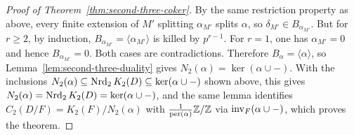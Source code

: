 \begin{proof}[Proof of Theorem~\ref{thm:second-three-coker}]
By the same restriction property as above, every finite extension of $M'$ splitting $\alpha_{M'}$ splits $\alpha$, so $\delta_{M'}\in B_{\alpha_{M'}}$.
But for $r\ge2$, by induction, $B_{\alpha_{M'}}=\langle\alpha_{M'}\rangle$ is killed by $p^{r-1}$.
For $r=1$, one has $\alpha_{M'}=0$ and hence $B_{\alpha_{M'}}=0$.
Both cases are contradictions.
Therefore $B_\alpha=\langle\alpha\rangle$, so Lemma~\ref{lem:second-three-duality} gives $N_2(\alpha)=\ker(\alpha\cup-)$.
With the inclusions $N_2(\alpha)\subseteq\operatorname{Nrd}_2K_2(D)\subseteq\ker(\alpha\cup-)$ shown above, this gives $N_2(\alpha)=\operatorname{Nrd}_2K_2(D)=\ker(\alpha\cup-)$, and the same lemma identifies $C_2(D/F)=K_2(F)/N_2(\alpha)$ with $\tfrac1{\operatorname{per}(\alpha)}\mathbb Z/\mathbb Z$ via $\operatorname{inv}_F(\alpha\cup-)$, which proves the theorem.
\end{proof}
